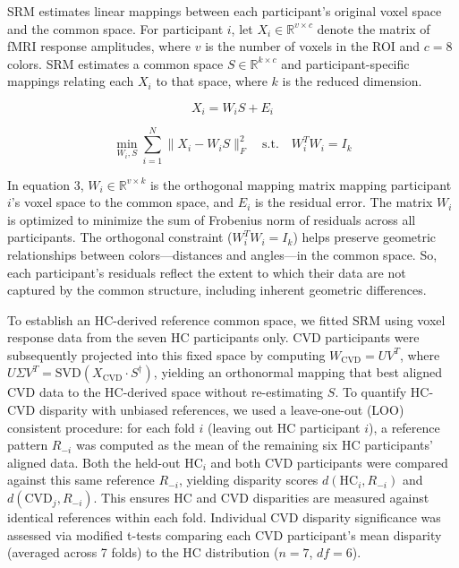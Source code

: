 SRM estimates linear mappings between each participant's original voxel space and the common space. For participant $i$, let $X_i \in \mathbb{R}^{v \times c}$ denote the matrix of fMRI response amplitudes, where $v$ is the number of voxels in the ROI and $c = 8$ colors. SRM estimates a common space $S \in \mathbb{R}^{k \times c}$ and participant-specific mappings relating each $X_i$ to that space, where $k$ is the reduced dimension.

\begin{equation}
X_i = W_i S + E_i
\end{equation}

\begin{equation}
\min_{W_i, S} \sum_{i=1}^N \|X_i - W_i S\|_F^2 \quad \text{s.t.} \quad W_i^T W_i = I_k
\end{equation}

In equation 3, $W_i \in \mathbb{R}^{v \times k}$ is the orthogonal mapping matrix mapping participant $i$'s voxel space to the common space, and $E_i$ is the residual error. The matrix $W_i$ is optimized to minimize the sum of Frobenius norm of residuals across all participants. The orthogonal constraint ($W_i^T W_i = I_k$) helps preserve geometric relationships between colors---distances and angles---in the common space. So, each participant's residuals reflect the extent to which their data are not captured by the common structure, including inherent geometric differences.

To establish an HC-derived reference common space, we fitted SRM using voxel response data from the seven HC participants only. CVD participants were subsequently projected into this fixed space by computing $W_{\text{CVD}} = U V^T$, where $U \Sigma V^T = \text{SVD}(X_{\text{CVD}} \cdot S^\dagger)$, yielding an orthonormal mapping that best aligned CVD data to the HC-derived space without re-estimating $S$. To quantify HC-CVD disparity with unbiased references, we used a leave-one-out (LOO) consistent procedure: for each fold $i$ (leaving out HC participant $i$), a reference pattern $R_{-i}$ was computed as the mean of the remaining six HC participants' aligned data. Both the held-out $\text{HC}_i$ and both CVD participants were compared against this same reference $R_{-i}$, yielding disparity scores $d(\text{HC}_i, R_{-i})$ and $d(\text{CVD}_j, R_{-i})$. This ensures HC and CVD disparities are measured against identical references within each fold. Individual CVD disparity significance was assessed via \textcite{crawford1998} modified t-tests comparing each CVD participant's mean disparity (averaged across 7 folds) to the HC distribution ($n=7$, $df=6$).

